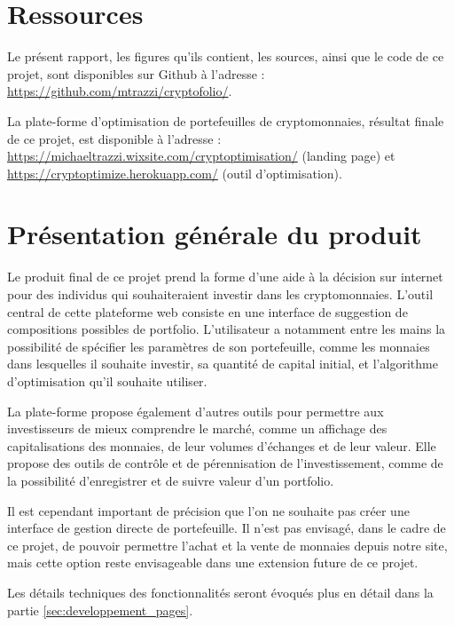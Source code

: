 \documentclass[a4paper, 10pt]{article}
\begin{document}
\section*{Ressources}
\label{sec:ressources}

Le présent rapport, les figures qu'ils contient, les sources, ainsi que le code de ce projet, sont disponibles sur Github à l'adresse : \url{https://github.com/mtrazzi/cryptofolio/}.

La plate-forme d'optimisation de portefeuilles de cryptomonnaies, résultat finale de ce projet, est disponible à l'adresse : \url{https://michaeltrazzi.wixsite.com/cryptoptimisation/} (landing page) et \url{https://cryptoptimize.herokuapp.com/} (outil d'optimisation).

\newpage
\section{Présentation générale du produit}
\label{sec:presentation}

Le produit final de ce projet prend la forme d'une aide à la décision sur internet pour des individus qui souhaiteraient investir dans les cryptomonnaies. L'outil central de cette plateforme web consiste en une interface de suggestion de compositions possibles de portfolio. L'utilisateur a notamment entre les mains la possibilité de spécifier les paramètres de son portefeuille, comme les monnaies dans lesquelles il souhaite investir, sa quantité de capital initial, et l'algorithme d'optimisation qu'il souhaite utiliser.

La plate-forme propose également d'autres outils pour permettre aux investisseurs de mieux comprendre le marché, comme un affichage des capitalisations des monnaies, de leur volumes d'échanges et de leur valeur. Elle propose des outils de contrôle et de pérennisation de l'investissement, comme de la possibilité d'enregistrer et de suivre valeur d'un portfolio.

Il est cependant important de précision que l'on ne souhaite pas créer une interface de gestion directe de portefeuille. Il n'est pas envisagé, dans le cadre de ce projet, de pouvoir permettre l'achat et la vente de monnaies depuis notre site, mais cette option reste envisageable dans une extension future de ce projet.

Les détails techniques des fonctionnalités seront évoqués plus en détail dans la partie \ref{sec:developpement_pages}.
\end{document}
